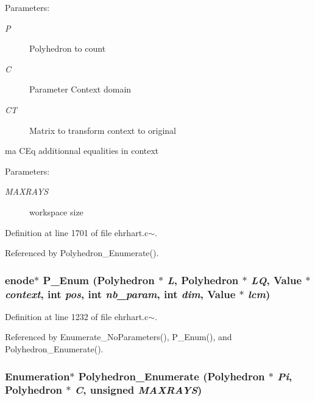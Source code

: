 \begin{Desc}
\item[Parameters: ]\par
\begin{description}
\item[{\em 
P}]Polyhedron to count \item[{\em 
C}]Parameter Context domain \item[{\em 
CT}]Matrix to transform context to original \end{description}
\end{Desc}
\begin{Desc}
\item[ma CEq     additionnal equalities in context]\par
\end{Desc}
\begin{Desc}
\item[Parameters: ]\par
\begin{description}
\item[{\em 
MAXRAYS}]workspace size \end{description}
\end{Desc}


Definition at line 1701 of file ehrhart.c$\sim$.

Referenced by Polyhedron\_\-Enumerate().

\subsubsection{\setlength{\rightskip}{0pt plus 5cm}enode$\ast$ P\_\-Enum (Polyhedron $\ast$ {\em L}, Polyhedron $\ast$ {\em LQ}, Value $\ast$ {\em context}, int {\em pos}, int {\em nb\_\-param}, int {\em dim}, Value $\ast$ {\em lcm})\hspace{0.3cm}{\tt  [static]}}\label{ehrhart_8c~_a24}




Definition at line 1232 of file ehrhart.c$\sim$.

Referenced by Enumerate\_\-No\-Parameters(), P\_\-Enum(), and Polyhedron\_\-Enumerate().

\subsubsection{\setlength{\rightskip}{0pt plus 5cm}Enumeration$\ast$ Polyhedron\_\-Enumerate (Polyhedron $\ast$ {\em Pi}, Polyhedron $\ast$ {\em C}, unsigned {\em MAXRAYS})}\label{ehrhart_8c~_a27}


